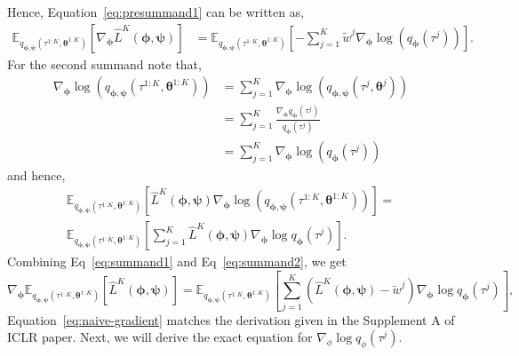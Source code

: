 \documentclass{article}
\newcommand{\bParam}{\bm{\theta}}
\newcommand{\E}{\mathbb{E}}
\begin{document}
Hence, Equation~\ref{eq:presummand1} can be written as,
\begin{align}\label{eq:summand1}
    \E_{q_{\bm{\phi}, \bm{\psi}}(\tau^{1:K}, \bParam^{1:K})}[\nabla_{\bm{\phi}} \hat{L}^K(\bm{\phi}, \bm{\psi})] &= \E_{q_{\bm{\phi}, \bm{\psi}}(\tau^{1:K}, \bParam^{1:K})}\left[- \sum_{j=1}^{K} \tilde{w}^j \nabla_{\bm{\phi}} \log(q_{\bm{\phi}}(\tau^j))\right].
\end{align}
For the second summand note that,
\begin{align*}
    \nabla_{\bm{\phi}} \log(q_{\bm{\phi}, \bm{\psi}}(\tau^{1:K}, \bParam^{1:K})) &= \sum\limits_{j=1}^{K} \nabla_{\bm{\phi}} \log(q_{\bm{\phi},\bm{\psi}}(\tau^{j}, \bParam^{j})) \\
    &= \sum\limits_{j=1}^{K} \frac{\nabla_{\bm{\phi}} q_{\bm{\phi}}(\tau^{j})}{q_{\bm{\phi}}(\tau^{j})} \\
    &= \sum\limits_{j=1}^{K} \nabla_{\bm{\phi}} \log(q_{\bm{\phi}}(\tau^{j}))
\end{align*}
and hence,
\begin{multline}\label{eq:summand2}
    \E_{q_{\bm{\phi}, \bm{\psi}}(\tau^{1:K}, \bParam^{1:K})}[\hat{L}^K(\bm{\phi}, \bm{\psi}) \nabla_{\bm{\phi}} \log(q_{\bm{\phi}, \bm{\psi}}(\tau^{1:K}, \bParam^{1:K}))] = \\
    \E_{q_{\bm{\phi}, \bm{\psi}}(\tau^{1:K},\bParam^{1:K})}\left[\sum\limits_{j=1}^{K} \hat{L}^K(\bm{\phi}, \bm{\psi}) \nabla_{\bm{\phi}} \log q_{\bm{\phi}}(\tau^{j})\right].
\end{multline}
Combining Eq~\ref{eq:summand1} and Eq~\ref{eq:summand2}, we get
\begin{equation}\label{eq:naive-gradient}
    \nabla_{\bm{\phi}} \E_{q_{\bm{\phi}, \bm{\psi}}(\tau^{1:K},\bParam^{1:K})}[\hat{L}^K(\bm{\phi}, \bm{\psi})] = \E_{q_{\bm{\phi}, \bm{\psi}}(\tau^{1:K},\bParam^{1:K})}\left[\sum\limits_{j=1}^{K} (\hat{L}^K(\bm{\phi}, \bm{\psi}) - \tilde{w}^j) \nabla_{\bm{\phi}} \log q_{\bm{\phi}}(\tau^j) \right],
\end{equation}
Equation~\ref{eq:naive-gradient} matches the derivation given in the Supplement A of ICLR paper.
Next, we will derive the exact equation for $\nabla_{\phi} \log q_{\phi}(\tau^j)$.
\end{document}

